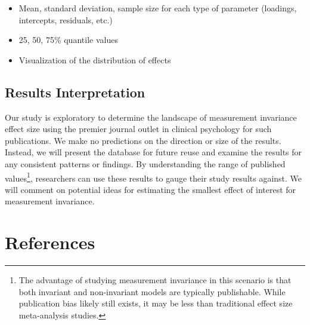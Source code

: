 \documentclass[
  english,
  man]{apa7}
\providecommand{\tightlist}{%
  \setlength{\itemsep}{0pt}\setlength{\parskip}{0pt}}
\begin{document}
\begin{itemize}
\tightlist
\item
  Mean, standard deviation, sample size for each type of parameter (loadings, intercepts, residuals, etc.)
\item
  25, 50, 75\% quantile values
\item
  Visualization of the distribution of effects
\end{itemize}

\subsection{Results Interpretation}\label{results-interpretation}

Our study is exploratory to determine the landscape of measurement invariance effect size using the premier journal outlet in clinical psychology for such publications. We make no predictions on the direction or size of the results. Instead, we will present the database for future reuse and examine the results for any consistent patterns or findings. By understanding the range of published values\footnote{The advantage of studying measurement invariance in this scenario is that both invariant and non-invariant models are typically publishable. While publication bias likely still exists, it may be less than traditional effect size meta-analysis studies.}, researchers can use these results to gauge their study results against. We will comment on potential ideas for estimating the smallest effect of interest for measurement invariance.

\newpage

\section{References}\label{references}
\end{document}
